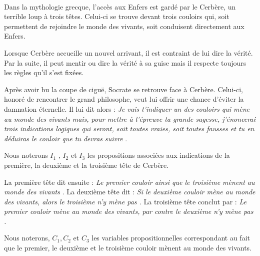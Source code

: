 \documentclass[11pt,a4paper]{article}
\begin{document}
\begin{Exercise}[title = {L'accès aux enfers}]\\
	Dans la mythologie grecque, l’accès aux Enfers est gardé par le Cerbère, un terrible loup à trois têtes. Celui-ci se trouve devant trois couloirs qui, soit
	permettent de rejoindre le monde des vivants, soit conduisent directement aux Enfers.

	Lorsque Cerbère accueille un nouvel arrivant, il est contraint de lui dire la vérité. Par la suite, il peut mentir ou dire la vérité à sa guise mais il respecte toujours les règles qu’il s’est fixées.

	Après avoir bu la coupe de ciguë, Socrate se retrouve face à Cerbère. Celui-ci, honoré de rencontrer le grand philosophe, veut lui offrir une chance d’éviter la damnation éternelle. Il lui dit alors : \og{} \textit{Je vais t’indiquer un des couloirs qui mène au monde des vivants mais, pour mettre à l’épreuve ta grande sagesse, j’énoncerai trois indications logiques qui seront, soit toutes vraies, soit toutes fausses et tu en déduiras le couloir que tu devras suivre} \fg{}.

	Nous noterons $I_1$ , $I_2$ et $I_3$ les propositions associées aux indications de la première, la deuxième et la troisième tête de Cerbère.

	\NRet \smallskip
	La première tête dit ensuite : \og{} \textit{Le premier couloir ainsi que le troisième mènent au monde des vivants} \fg{}.
	La deuxième tête dit : \og{} \textit{Si le deuxième couloir mène au monde des vivants, alors le troisième n'y mène pas \fg{}.}
	La troisième tête conclut par : \og{} \textit{Le premier couloir mène au monde des vivants, par contre le deuxième n'y mène pas \fg{}.}

	Nous noterons, $C_1, C_2$ et $C_3$ les variables propositionnelles correspondant au fait que le premier, le deuxième et le troisième couloir mènent au monde des vivants.


\end{Exercise}
\end{document}
